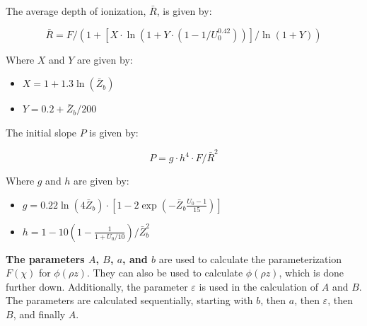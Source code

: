 The average depth of ionization, $\bar{R}$, is given by:

\begin{equation}
    \label{eq:theory:quantitative:pap:R_bar}
    \bar{R} = F / (1 + [X \cdot \ln(1 + Y \cdot (1 - 1/U_0^{0.42}))]/\ln(1 + Y))
\end{equation}

Where $X$ and $Y$ are given by:

\begin{itemize}
    \item $ X = 1 + 1.3 \ln(\bar{Z}_b) $
    \item $ Y = 0.2 + \bar{Z}_b/200 $
\end{itemize}




The initial slope $P$ is given by:

\begin{equation}
    \label{eq:theory:quantitative:pap:slope_P}
    P = g \cdot h^4 \cdot F/\bar{R}^2
\end{equation}

Where $g$ and $h$ are given by:

\begin{itemize}
    \item $ g = 0.22 \ln(4 \bar{Z}_b) \cdot [1 - 2 \exp(-\bar{Z}_b \frac{U_0 - 1}{15})] $
    \item $ h = 1 - 10(1-\frac{1}{1+ U_0/10})/\bar{Z}_b^2 $
\end{itemize}








\textbf{The parameters $A$, $B$, $a$, and $b$} are used to calculate the parameterization $F(\chi)$ for $\phi(\rho z)$.
They can also be used to calculate $\phi(\rho z)$, which is done further down.
Additionally, the parameter $\varepsilon$ is used in the calculation of $A$ and $B$.
The parameters are calculated sequentially, starting with $b$, then $a$, then $\varepsilon$, then $B$, and finally $A$.



